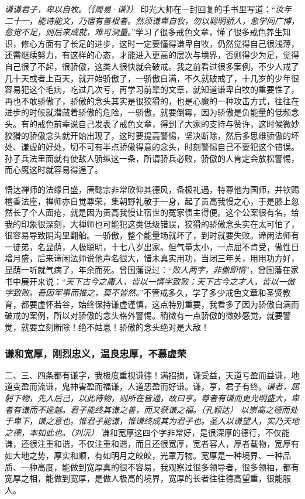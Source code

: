 \textit{谦谦君子，卑以自牧。（《周易·谦》）} 印光大师在一封回复的手书里写道：“\textit{汝年二十一，能诗能文，乃宿有善根者。然须谦卑自牧，勿以聪明骄人，愈学问广博，愈觉不足，则后来成就，难可测量。}”学习了很多戒色文章，懂了很多戒色养生知识，修心方面有了长足的进步，这时一定要懂得谦卑自牧，仍然觉得自己很浅薄，还需继续努力，有这样的心态，才能进入更高的层次与境界，否则得少为足，觉得自己很了不起，很骄傲，这类人很快就会破戒。我之前看过很多案例，不少人戒了几十天或者上百天，就开始骄傲了，一骄傲自满，不久就破戒了，十几岁的少年很容易犯这个毛病，吃过几次亏，再学习前辈的文章，就知道谦卑自牧的重要性了，再也不敢骄傲了，骄傲的念头其实是很狡猾的，也是心魔的一种攻击方式，往往在进步的时候就潜藏着骄傲的危险，一骄傲，就要倒霉，因为骄傲是负能量的低频念头。有的戒色前辈说自己发表了戒色文章，得到了大家的支持与赞许，这时候微妙狡猾的骄傲念头就开始出现了，这时要提高警惕，坚决断除，然后多思维骄傲的坏处、谦虚的好处，切不可有半点骄傲得意的念头，时刻警惕自己不要犯这个错误。孙子兵法里面就有使敌人骄纵这一条，所谓骄兵必败，骄傲的人肯定会放松警惕，而心魔这时就容易得逞了。

悟达禅师的法缘日盛，唐懿宗非常欣仰其德风，备极礼遇，特尊他为国师，并钦赐檀香法座，禅师亦自觉尊荣，集朝野礼敬于一身，起了贡高我慢之心，于是膝上忽然长了个人面疮，就是因为贡高我慢让宿世的冤家债主得便。这个公案很有名，给我的印象很深刻，大禅师也可能犯这类低级错误，狡猾的骄傲念头实在太可怕了，很容易导致阴沟里翻船。一骄傲，整个能量场就坏了，到时就要失败。谛闲法师有一徒弟，名显荫，人极聪明，十七八岁出家。但气量太小，一点屈不肯受，傲性日增月盛，后来谛闲法师说他声名很大，惜未真实用功，当闭三年关，用用功方好，显荫一听就气病了，年余而死。曾国藩说过：“\textit{败人两字，非傲即惰}”，曾国藩在家书中展开来说：“\textit{天下古今之庸人，皆以一惰字致败；天下古今之才人，皆以一傲字致败。吾因军事而推之，莫不皆然。}”不管戒多久，学了多少戒色文章和圣贤教育，都要虚怀若谷，始终保持谦虚谨慎，这点特别重要，我看多了因为骄傲自满而破戒的案例，所以对骄傲的念头格外警惕。稍微有一点骄傲的微妙感觉，就要警觉，就要立刻断除！绝不姑息！骄傲的念头绝对是大敌！

\subsubsection{谦和宽厚，刚烈忠义，温良忠厚，不慕虚荣}

二、三、四条都有谦字，我极度重视谦德！满招损，谦受益，天道亏盈而益谦，地道变盈而流谦，鬼神害盈而福谦，人道恶盈而好谦。谦，亨，君子有终。\textit{谦者，屈躬下物，先人后己，以此待物，则所在皆通，故曰亨。尊者有谦而更光明盛大，卑者有谦而不逾越。君子能终其谦之善，而又获谦之福。（孔颖达）} \textit{以崇高之德而处于卑下，谦之意也。惟君子能谦，惟谦终成其为君子也。圣人以谦望人，实乃天地之德，本如此也。（刘沅）} 谦和宽厚这四个字非常好，是很深厚的德行，不仅能谦，还很注重和谐，不仅注重和谐，而且还很宽厚，宽者容人，厚者载物，宽厚有如大地之势，厚实和顺，有如明月之皎皎，光罩万物。宽厚是一种境界、一种品质、一种高度，能做到宽厚真的很不容易，我观察过很多领导者，很多领袖，都有宽厚之相，能做到宽厚，是做人极高的境界，宽厚的长者往往德高望重，很能服人。


